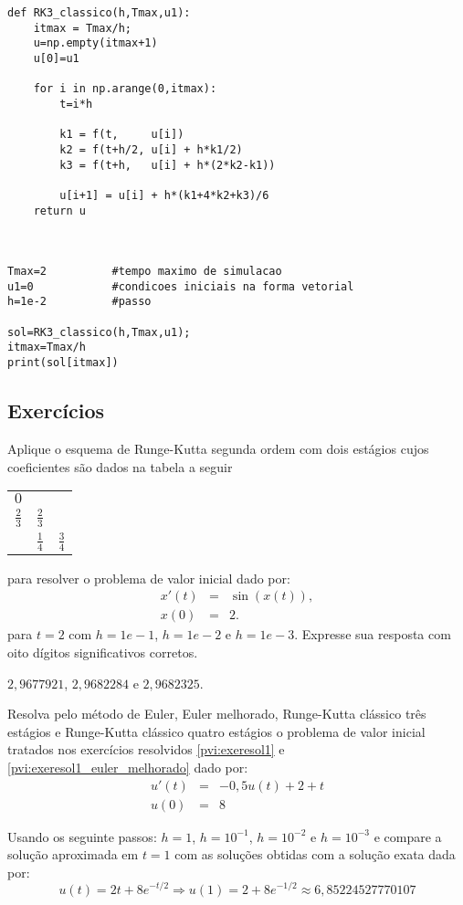 \begin{exeresol}
\begin{verbatim}
def RK3_classico(h,Tmax,u1):
  	itmax = Tmax/h;
	u=np.empty(itmax+1)
	u[0]=u1
	
	for i in np.arange(0,itmax):
		t=i*h

		k1 = f(t,     u[i])
		k2 = f(t+h/2, u[i] + h*k1/2)
		k3 = f(t+h,   u[i] + h*(2*k2-k1))

		u[i+1] = u[i] + h*(k1+4*k2+k3)/6
	return u


	
Tmax=2			#tempo maximo de simulacao
u1=0			#condicoes iniciais na forma vetorial
h=1e-2			#passo

sol=RK3_classico(h,Tmax,u1);
itmax=Tmax/h
print(sol[itmax])
\end{verbatim}

\fi
 
\end{exeresol}

\subsection*{Exercícios}
\begin{exer} Aplique o esquema de Runge-Kutta segunda ordem com dois estágios cujos coeficientes são dados na tabela a seguir
 \begin{tabular}{c|cc}
  $0$ &   &   \\
  $\frac{2}{3}$ & $\frac{2}{3}$ &   \\  \hline
    & $\frac{1}{4}$ & $\frac{3}{4}$
\end{tabular}
para resolver o problema de valor inicial dado por:
\begin{eqnarray*}
x'(t)&=&\sin(x(t)),\\
x(0)&=&2.
\end{eqnarray*}
para $t=2$ com $h=1e-1$, $h=1e-2$ e $h=1e-3$. Expresse sua resposta com oito dígitos significativos corretos.
\end{exer}
\begin{resp}
 $2,9677921$, $2,9682284$ e $2,9682325$.
\end{resp}


\begin{exer}Resolva pelo método de Euler, Euler melhorado, Runge-Kutta clássico três estágios e Runge-Kutta clássico quatro estágios o problema de valor inicial tratados nos  exercícios resolvidos \ref{pvi:exeresol1} e \ref{pvi:exeresol1_euler_melhorado} dado por:
\begin{eqnarray}
     u'(t)&=& -0,5u(t)+2+t\\
            u(0) &=&  8
\end{eqnarray}

Usando os seguinte passos: $h=1$, $h=10^{-1}$, $h=10^{-2}$ e $h=10^{-3}$ e compare a solução aproximada em $t=1$ com as soluções obtidas com a solução exata dada por:
\begin{equation}
     u(t) = 2t+8e^{-t/2} \Longrightarrow u(1)=2+8e^{-1/2} \approx 6,85224527770107
\end{equation}
\end{exer}

